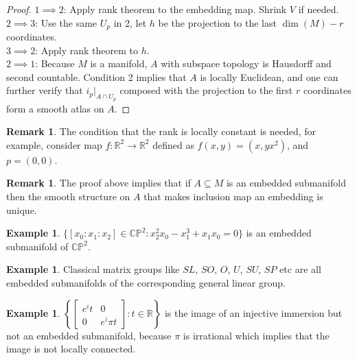 \documentclass{article}
\theoremstyle{definition}
\newtheorem{rmk}[thm]{Remark}
\newtheorem{exm}[thm]{Example}
\begin{document}
\begin{proof}
$1\implies 2$: Apply rank theorem to the embedding map. Shrink $V$ if needed.\\

$2\implies 3$: Use the same $U_p$ in 2, let $h$ be the projection to the last $\dim(M)-r$ coordinates.\\

$3\implies 2$: Apply rank theorem to $h$.\\

$2\implies 1$: Because $M$ is a manifold, $A$ with subspace topology is Hausdorff and second countable. Condition 2 implies that $A$ is locally Euclidean, and one can further verify that $i_p|_{A\cap U_p}$ composed with the projection to the first $r$ coordinates form a smooth atlas on $A$.
\end{proof}

\begin{rmk}
    The condition that the rank is locally constant is needed, for example, consider map $f: \mathbb{R}^2\rightarrow \mathbb{R}^2$ defined as $f(x, y)=(x, yx^2)$, and $p=(0, 0)$.
\end{rmk}

\begin{rmk}
    The proof above implies that if $A\subseteq M$ is an embedded submanifold then the smooth structure on $A$ that makes inclusion map an embedding is unique.
\end{rmk}

\begin{exm}
    $\{[x_0:x_1:x_2]\in\mathbb{CP}^2: x_2^2x_0-x_1^3+x_1x_0=0\}$ is an embedded submanifold of $\mathbb{CP}^2$.
\end{exm}

\begin{exm}
    Classical matrix groups like $SL$, $SO$, $O$, $U$, $SU$, $SP$ etc are all embedded submanifolds of the corresponding general linear group.
\end{exm}

\begin{exm}
    $\left\{\left[\begin{array}{cc}e^it & 0\\ 0 & e^i\pi t\end{array}\right]: t\in\mathbb{R}\right\}$ is the image of an injective immersion but not an embedded submanifold, because $\pi$ is irrational which implies that the image is not locally connected.
\end{exm}


\newpage
\end{document}
